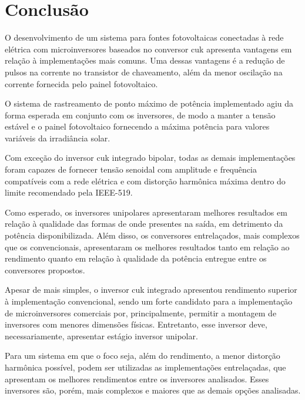 \documentclass[
	12pt,				%
	openany,
	onseside,
	a4paper,			%
	english,			%
	french,				%
	spanish,			%
	brazil,				%
	]{abntex2}
\begin{document}
\chapter{Conclusão}


O desenvolvimento de um sistema para fontes fotovoltaicas conectadas à rede elétrica com microinversores baseados no conversor cuk apresenta vantagens em relação à implementações mais comuns. Uma dessas vantagens é a redução de pulsos na corrente no transistor de chaveamento, além da menor oscilação na corrente fornecida pelo painel fotovoltaico.

O sistema de rastreamento de ponto máximo de potência implementado agiu da forma esperada em conjunto com os inversores, de modo a manter a tensão estável e o painel fotovoltaico fornecendo a máxima potência para valores variáveis da irradiância solar.

Com exceção do inversor cuk integrado bipolar, todas as demais implementações foram capazes de fornecer tensão senoidal com amplitude e frequência compatíveis com a rede elétrica e com distorção harmônica máxima dentro do limite recomendado pela IEEE-519.

Como esperado, os inversores unipolares apresentaram melhores resultados em relação à qualidade das formas de onde presentes na saída, em detrimento da potência disponibilizada. Além disso, os conversores entrelaçados, mais complexos que os convencionais, apresentaram os melhores resultados tanto em relação ao rendimento quanto em relação à qualidade da potência entregue entre os conversores propostos. 

Apesar de mais simples, o inversor cuk integrado apresentou rendimento superior à implementação convencional, sendo um forte candidato para a implementação de microinversores comerciais por, principalmente, permitir a montagem de inversores com menores dimensões físicas. Entretanto, esse inversor deve, necessariamente, apresentar estágio inversor unipolar.

Para um sistema em que o foco seja, além do rendimento, a menor distorção harmônica possível, podem ser utilizadas as implementações entrelaçadas, que apresentam os melhores rendimentos entre os inversores analisados. Esses inversores são, porém, mais complexos e maiores que as demais opções analisadas.
\end{document}
